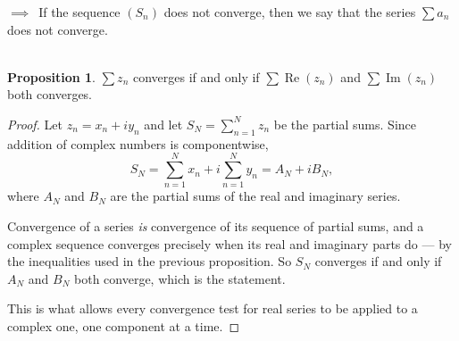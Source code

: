 \documentclass[11pt,a4paper]{article}
\theoremstyle{definition}
\newtheorem{proposition}[thm]{Proposition}
\begin{document}
$\implies\,$ If the sequence $(S_n)$ does not converge, then we say that the series $\displaystyle{\sum a_n}$ does not converge.\\\\




\begin{proposition}
$\displaystyle{\sum z_n}$ converges if and only if $\displaystyle{\sum \operatorname{Re}(z_n)}$ and $\displaystyle{\sum \operatorname{Im} (z_n)}$ both converges.
\end{proposition}

\begin{proof}
Let $z_n=x_n+iy_n$ and let $S_N=\sum_{n=1}^{N}z_n$ be the partial sums. Since
addition of complex numbers is componentwise,
$$S_N=\sum_{n=1}^{N}x_n+i\sum_{n=1}^{N}y_n=A_N+iB_N ,$$
where $A_N$ and $B_N$ are the partial sums of the real and imaginary series.

Convergence of a series \emph{is} convergence of its sequence of partial sums,
and a complex sequence converges precisely when its real and imaginary parts do
--- by the inequalities used in the previous proposition. So $S_N$ converges if
and only if $A_N$ and $B_N$ both converge, which is the statement.

This is what allows every convergence test for real series to be applied to a
complex one, one component at a time.
\end{proof}
\end{document}
